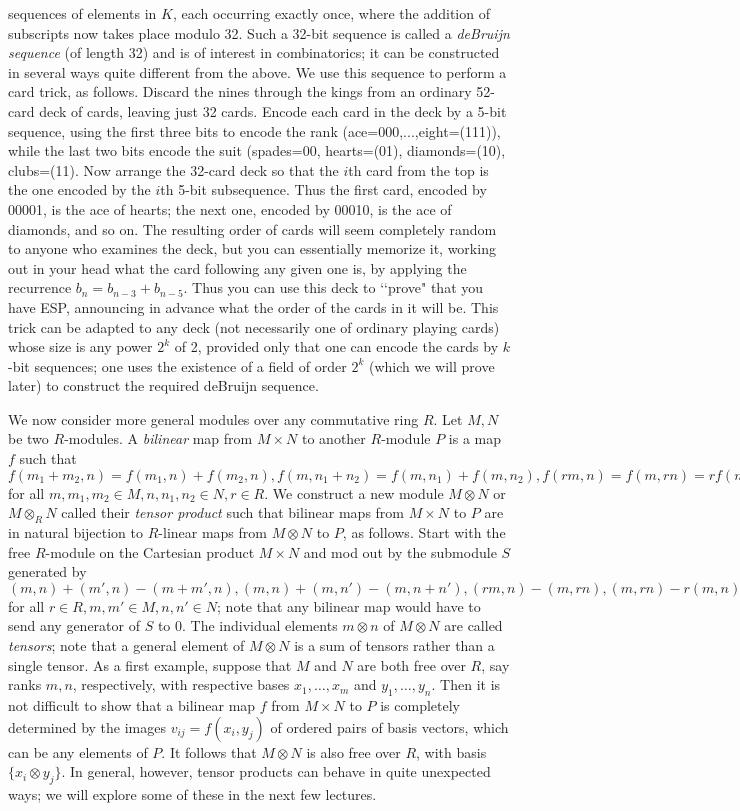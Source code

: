 \documentclass[10pt]{article}
\begin{document}
sequences of elements in $K$, each occurring exactly once, where the
addition of subscripts now takes place modulo 32. Such a 32-bit sequence
is called a {\sl deBruijn sequence} (of length 32) and is of interest in
combinatorics; it can be constructed in several ways quite different
from the above. We use this sequence to perform a card trick, as
follows. Discard the nines through the kings from an ordinary 52-card
deck of cards, leaving just 32 cards. Encode each card in the deck by a
5-bit sequence, using the first three bits to encode the rank
(ace=000,...,eight=(111)), while the last two bits encode the suit
(spades=00, hearts=(01), diamonds=(10), clubs=(11). Now arrange the
32-card deck so that the $i$th card from the top is the one encoded by
the $i$th 5-bit subsequence. Thus the first card, encoded by 00001, is
the ace of hearts; the next one, encoded by 00010, is the ace of
diamonds, and so on. The resulting order of cards will seem completely
random to anyone who examines the deck, but you can essentially memorize
it, working out in your head what the card following any given one is,
by applying the recurrence $b_n = b_{n-3} + b_{n-5}$. Thus you can use
this deck to \lq\lq prove" that you have ESP, announcing in advance what
the order of the cards in it will be. This trick can be adapted to any
deck (not necessarily one of ordinary playing cards) whose size is any
power $2^k$ of 2, provided only that one can encode the cards by $k$-bit
sequences; one uses the existence of a field of order $2^k$ (which we
will prove later) to construct the required deBruijn sequence.

We now consider more general modules over any commutative ring $R$. Let
$M,N$ be two $R$-modules. A {\sl bilinear} map from $M\times N$ to
another $R$-module $P$ is a map $f$ such that $f(m_1+m_2,n) =
f(m_1,n)+f(m_2,n), f(m,n_1+n_2) = f(m,n_1)+f(m,n_2), f(rm,n) = f(m,rn) =
rf(m,n)$ for all $m,m_1,m_2\in M, n,n_1,n_2\in N, r\in R$. We construct
a new module $M\otimes N$ or $M\otimes_R N$ called their {\sl tensor
  product} such that bilinear maps from $M\times N$ to $P$ are in
natural bijection to $R$-linear maps from $M\otimes N$ to $P$, as
follows. Start with the free $R$-module on the Cartesian product
$M\times N$ and mod out by the submodule $S$ generated by $(m,n) +
(m',n) - (m+m',n), (m,n) + (m,n') - (m,n+n'), (rm,n) - (m,rn),(m,rn) -
r(m,n)$ for all $r\in R,m,m'\in M, n,n'\in N$; note that any bilinear
map would have to send any generator of $S$ to 0. The individual
elements $m\otimes n$ of $M\otimes N$ are called {\sl tensors}; note
that a general element of $M\otimes N$ is a sum of tensors rather than a
single tensor. As a first example, suppose that $M$ and $N$ are both
free over $R$, say ranks $m,n$, respectively, with respective bases
$x_1,\ldots,x_m$ and $y_1,\ldots,y_n$. Then it is not difficult to show
that a bilinear map $f$ from $M\times N$ to $P$ is completely determined
by the images $v_{ij}=f(x_i,y_j)$ of ordered pairs of basis vectors,
which can be any elements of $P$. It follows that $M\otimes N$ is also
free over $R$, with basis $\{x_ i\otimes y_j\}$. In general, however,
tensor products can behave in quite unexpected ways; we will explore
some of these in the next few lectures.
\end{document}
